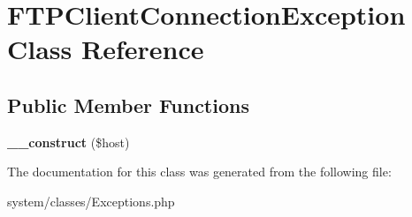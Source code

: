 \hypertarget{class_f_t_p_client_connection_exception}{
\section{FTPClientConnectionException Class Reference}
\label{class_f_t_p_client_connection_exception}
}
\subsection*{Public Member Functions}
\begin{DoxyCompactItemize}
\item 
\hypertarget{class_f_t_p_client_connection_exception_a04ba7d25bd740d253a149bbd6f2be25f}{
{\bfseries \_\-\_\-construct} (\$host)}
\label{class_f_t_p_client_connection_exception_a04ba7d25bd740d253a149bbd6f2be25f}

\end{DoxyCompactItemize}


The documentation for this class was generated from the following file:\begin{DoxyCompactItemize}
\item 
system/classes/Exceptions.php\end{DoxyCompactItemize}
